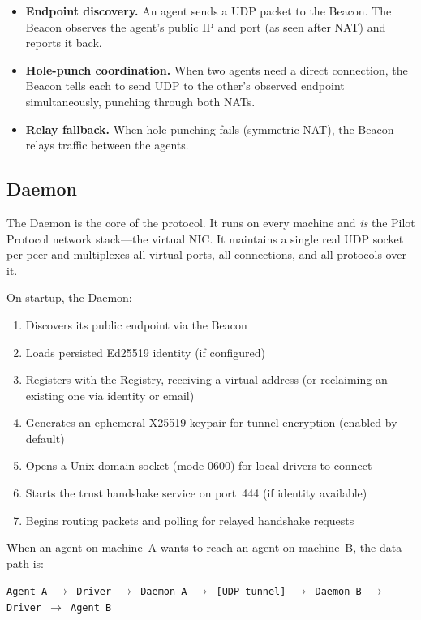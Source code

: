 \documentclass[11pt,a4paper]{article}
\begin{document}
\begin{itemize}
    \item \textbf{Endpoint discovery.} An agent sends a UDP packet to the Beacon. The Beacon observes the agent's public IP and port (as seen after NAT) and reports it back.
    \item \textbf{Hole-punch coordination.} When two agents need a direct connection, the Beacon tells each to send UDP to the other's observed endpoint simultaneously, punching through both NATs.
    \item \textbf{Relay fallback.} When hole-punching fails (symmetric NAT), the Beacon relays traffic between the agents.
\end{itemize}

\subsection{Daemon}

The Daemon is the core of the protocol. It runs on every machine and \emph{is} the Pilot Protocol network stack---the virtual NIC. It maintains a single real UDP socket per peer and multiplexes all virtual ports, all connections, and all protocols over it.

On startup, the Daemon:
\begin{enumerate}
    \item Discovers its public endpoint via the Beacon
    \item Loads persisted Ed25519 identity (if configured)
    \item Registers with the Registry, receiving a virtual address (or reclaiming an existing one via identity or email)
    \item Generates an ephemeral X25519 keypair for tunnel encryption (enabled by default)
    \item Opens a Unix domain socket (mode 0600) for local drivers to connect
    \item Starts the trust handshake service on port~444 (if identity available)
    \item Begins routing packets and polling for relayed handshake requests
\end{enumerate}

When an agent on machine~A wants to reach an agent on machine~B, the data path is:

\begin{center}
\texttt{Agent\,A $\rightarrow$ Driver $\rightarrow$ Daemon\,A $\rightarrow$ [UDP tunnel] $\rightarrow$ Daemon\,B $\rightarrow$ Driver $\rightarrow$ Agent\,B}
\end{center}
\end{document}
